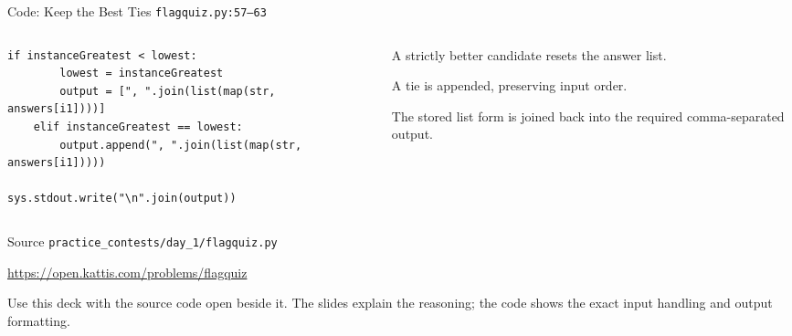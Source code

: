 \documentclass[aspectratio=169,11pt]{beamer}
\begin{document}
\begin{frame}[fragile]{Code: Keep the Best Ties}
\scriptsize
{} \texttt{flagquiz.py:57--63}

\vspace{0.08cm}
\begin{columns}[T,totalwidth=\textwidth]
\begin{column}{0.58\textwidth}
\begin{lstlisting}[style=cpcode]
    if instanceGreatest < lowest:
        lowest = instanceGreatest
        output = [", ".join(list(map(str, answers[i1])))]
    elif instanceGreatest == lowest:
        output.append(", ".join(list(map(str, answers[i1]))))

sys.stdout.write("\n".join(output))
\end{lstlisting}
\end{column}
\begin{column}{0.38\textwidth}
\begin{tightitemize}
  \item A strictly better candidate resets the answer list.
  \item A tie is appended, preserving input order.
  \item The stored list form is joined back into the required comma-separated output.
\end{tightitemize}
\end{column}
\end{columns}
\end{frame}

\begin{frame}{Source}
\small
{} \texttt{practice\_contests/day\_1/flagquiz.py}

\vspace{0.3cm}
 \url{https://open.kattis.com/problems/flagquiz}

\vspace{0.45cm}
Use this deck with the source code open beside it. The slides explain the reasoning; the code shows the exact input handling and output formatting.
\end{frame}
\end{document}
